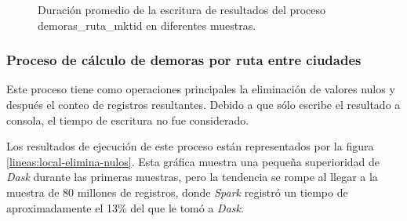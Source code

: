 \begin{figure}
\centering
{}
\caption{Duración promedio de la escritura de resultados del proceso demoras\_ruta\_mktid en diferentes muestras.}
\label{lineas:local-demoras-ruta-mktid-write}
\end{figure}

\subsubsection{Proceso de cálculo de demoras por ruta entre ciudades}

Este proceso tiene como operaciones principales la eliminación de valores nulos y después el conteo de registros resultantes. Debido a que sólo escribe el resultado a consola, el tiempo de escritura no fue considerado.

Los resultados de ejecución de este proceso están representados por la figura \ref{lineas:local-elimina-nulos}. Esta gráfica muestra una pequeña superioridad de \textit{Dask} durante las primeras muestras, pero la tendencia se rompe al llegar a la muestra de 80 millones de registros, donde \textit{Spark} registró un tiempo de aproximadamente el 13\% del que le tomó a \textit{Dask}. 

